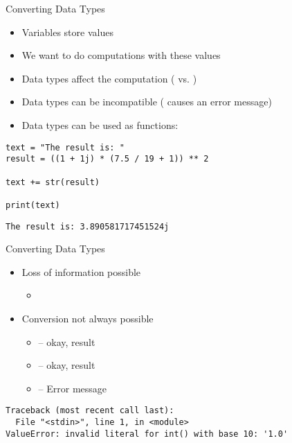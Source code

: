 \begin{frame}[fragile]{Converting Data Types}
%
\begin{itemize}
\item Variables store values
\item We want to do computations with these values
\item Data types affect the computation ( vs. )
\item Data types can be incompatible ( causes an error message)
\item Data types can be used as functions:  \thus~ 
\end{itemize}

\vspace{6pt}
\begin{codebox}[Code: Data Type Conversion, width=.5\linewidth, nobeforeafter, equal height group = grpToString]
\begin{verbatim}
text = "The result is: "
result = ((1 + 1j) * (7.5 / 19 + 1)) ** 2

text += str(result)

print(text)
\end{verbatim}
\end{codebox}
%
\begin{cmdbox}[Output: Data Type Conversion, width=.49\linewidth, nobeforeafter, equal height group = grpToString]
\begin{verbatim}
The result is: 3.890581717451524j
\end{verbatim}
\end{cmdbox}
%
\end{frame}


\begin{frame}[fragile]{Converting Data Types}
%
\begin{itemize}
\item Loss of information possible
	\begin{itemize}
	\item {} \thus~ 
	\end{itemize}
\item Conversion not always possible
	\begin{itemize}
	\item {} -- okay, result 
	\item {} -- okay, result 
	\item  {} -- Error message
	\end{itemize}
\end{itemize}
%
\begin{cmdbox}
\begin{verbatim}
Traceback (most recent call last):
  File "<stdin>", line 1, in <module>
ValueError: invalid literal for int() with base 10: '1.0'
\end{verbatim}
\end{cmdbox}
%
\end{frame}


